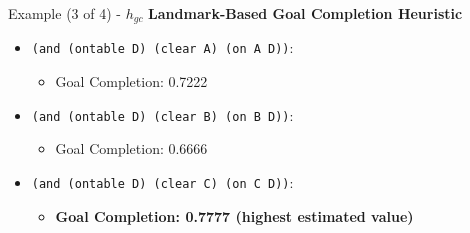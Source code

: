 \documentclass{beamer}
\begin{document}
    \begin{frame}{Example (3 of 4) - $h_{gc}$}
		\textbf{Landmark-Based Goal Completion Heuristic}
       	\begin{itemize}
       		\item \texttt{(and (ontable D) (clear A) (on A D))}:%
				\begin{itemize}
					\item Goal Completion: 0.7222
				\end{itemize}
			\item \texttt{(and (ontable D) (clear B) (on B D))}:%
				\begin{itemize}
					\item Goal Completion: 0.6666
				\end{itemize}
			\item \texttt{(and (ontable D) (clear C) (on C D))}:%
				\begin{itemize}
					\item \textbf{Goal Completion: 0.7777 (highest estimated value)}
				\end{itemize}
		\end{itemize}
    \end{frame}
\end{document}
